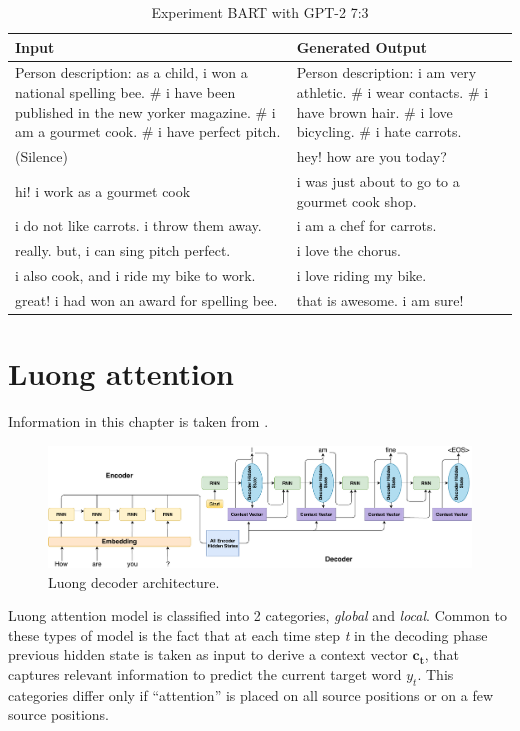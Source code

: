 \begin{table}[ht]
\centering
 \begin{tabular}{|p{7cm}|p{7cm}|} 
 \hline\hline
 \textbf{Input} & \textbf{Generated Output} \\
 \hline\hline
 Person description: as a child, i won a national spelling bee. \# i have been published in the new yorker magazine. \# i am a gourmet cook. \# i have perfect pitch. & Person description: i am very athletic. \# i wear contacts. \# i have brown hair. \# i love bicycling. \# i hate carrots. \\
 \hline
 (Silence) & hey! how are you today? \\ 
 \hline
 hi! i work as a gourmet cook & i was just about to go to a gourmet cook shop. \\
 \hline
 i do not like carrots. i throw them away. & i am a chef for carrots.\\
 \hline 
 really. but, i can sing pitch perfect. & i love the chorus. \\
 \hline
 i also cook, and i ride my bike to work. & i love riding my bike. \\
 \hline 
 great! i had won an award for spelling bee. & that is awesome. i am sure! \\
 \hline\hline
 \end{tabular}
 \caption{Experiment BART with GPT-2 7:3}
\label{tab:bart_conversation_gpt2}
\end{table}

\chapter{Luong attention}
\label{luong}
Information in this chapter is taken from \cite{luong2015effective}.
\begin{figure}[hbt]
  \centering
  \includegraphics[width=1\textwidth]{figures/luong_decoder.pdf}
  \caption{Luong decoder architecture.}
  \label{luong}
\end{figure}

Luong attention model is classified into 2 categories, \textit{global} and \textit{local}. Common to these types of model is the fact that at each time step \textit{t} in the decoding phase previous hidden state is taken as input to derive a context vector $\mathbf{c_t}$, that captures relevant information to predict the current target word $y_t$. This categories differ only if ``attention'' is placed on all source positions or on a few source positions.


